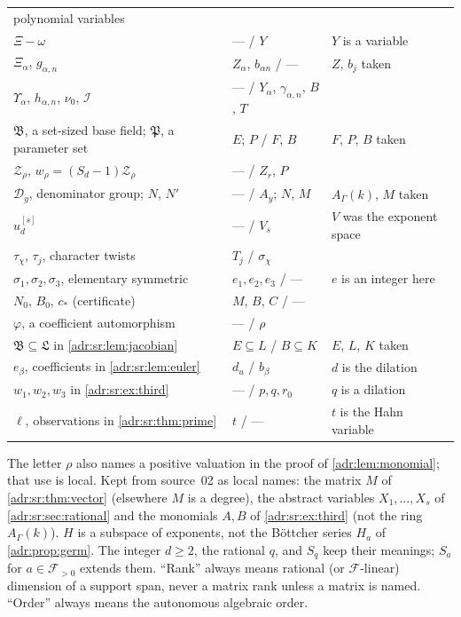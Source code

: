 \documentclass[11pt,letterpaper]{article}
\numberwithin{equation}{section}
\theoremstyle{definition}
\theoremstyle{remark}
\newcommand{\A}{A_\Gamma(k)}
\begin{document}
\begin{center}
\begin{tabularx}{\textwidth}{@{}P{0.30\textwidth}P{0.25\textwidth}Y@{}}
polynomial variables\\
$\Xi-\omega$ & --- / $Y$ & $Y$ is a variable\\
$\Xi_\alpha$, $g_{\alpha,n}$ & $Z_\alpha$, $b_{\alpha n}$ / --- & $Z$, $b_j$
taken\\
$\Upsilon_\alpha$, $h_{\alpha,n}$, $\nu_0$, $\mathcal I$ & --- /
$Y_\alpha$, $\gamma_{\alpha,n}$, $B$, $T$ & \\
$\mathfrak B$, a set-sized base field; $\mathfrak P$, a parameter set &
$E$; $P$ / $F$, $B$ & $F$, $P$, $B$ taken\\
$\mathcal Z_\rho$, $w_\rho=(S_d-1)\mathcal Z_\rho$ & --- / $Z_r$, $P$ & \\
$\mathcal D_y$, denominator group; $N$, $N'$ & --- / $A_y$; $N$, $M$ & $\A$,
$M$ taken\\
$u_d^{[s]}$ & --- / $V_s$ & $V$ was the exponent space\\
$\tau_\chi$, $\tau_j$, character twists & $T_j$ / $\sigma_\chi$ & \\
$\sigma_1,\sigma_2,\sigma_3$, elementary symmetric & $e_1,e_2,e_3$ / --- &
$e$ is an integer here\\
$N_0$, $B_0$, $c_*$ (certificate) & $M$, $B$, $C$ / --- & \\
$\varphi$, a coefficient automorphism & --- / $\rho$ & \\
$\mathfrak B\subseteq\mathfrak L$ in \cref{adr:sr:lem:jacobian} & $E\subseteq L$ /
$B\subseteq K$ & $E$, $L$, $K$ taken\\
$e_\beta$, coefficients in \cref{adr:sr:lem:euler} & $d_u$ / $b_\beta$ & $d$
is the dilation\\
$w_1,w_2,w_3$ in \cref{adr:sr:ex:third} & --- / $p,q,r_0$ & $q$ is a
dilation\\
$\ell$, observations in \cref{adr:sr:thm:prime} & $t$ / --- & $t$ is the
Hahn variable\\
\bottomrule
\end{tabularx}
\end{center}
The letter $\rho$ also names a positive valuation in the proof of
\cref{adr:lem:monomial}; that use is local. Kept from source~02 as local
names: the matrix $M$ of \cref{adr:sr:thm:vector} (elsewhere $M$ is a degree),
the abstract variables $X_1,\ldots,X_s$ of \cref{adr:sr:sec:rational} and the
monomials $A,B$ of \cref{adr:sr:ex:third} (not the ring $\A$). $H$ is a subspace of exponents,
not the B\"ottcher series $H_a$ of \cref{adr:prop:germ}. The integer $d\ge2$,
the rational $q$, and $S_q$ keep their meanings; $S_a$ for $a\in\mathcal F_{>0}$
extends them. ``Rank'' always means rational (or $\mathcal F$-linear)
dimension of a support span, never a matrix rank unless a matrix is named.
``Order'' always means the autonomous algebraic order.
\end{document}
